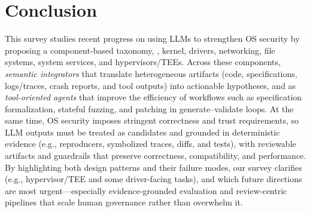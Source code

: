 \section{Conclusion}

This survey studies recent progress on using LLMs to strengthen OS security by proposing a component-based taxonomy, , kernel, drivers, networking, file systems, system services, and hypervisors/TEEs.
Across these components,  \emph{semantic integrators} that translate heterogeneous artifacts (code, specifications, logs/traces, crash reports, and tool outputs) into actionable hypotheses, and as \emph{tool-oriented agents} that improve the efficiency of workflows such as specification formalization, stateful fuzzing, and patching in generate--validate loops.
At the same time, OS security imposes stringent correctness and trust requirements, so LLM outputs must be treated as candidates and grounded in deterministic evidence (e.g., reproducers, symbolized traces, diffs, and tests), with reviewable artifacts and guardrails that preserve correctness, compatibility, and performance. 
By highlighting both  design patterns and their failure modes, our survey clarifies  (e.g., hypervisor/TEE and some driver-facing tasks), and which future directions are most urgent---especially evidence-grounded evaluation and review-centric pipelines that scale human governance rather than overwhelm it.

